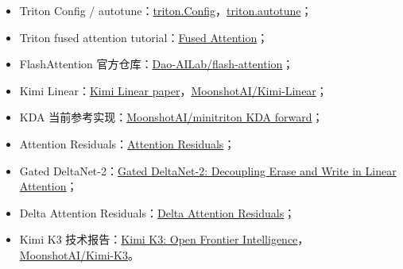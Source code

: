 \documentclass[profile=standard,twoside=false]{ipara-handbook}
\begin{document}
\begin{itemize}
  \item Triton Config / autotune：\href{https://triton-lang.org/main/python-api/generated/triton.Config.html}{triton.Config}，\href{https://triton-lang.org/main/python-api/generated/triton.autotune.html}{triton.autotune}；
  \item Triton fused attention tutorial：\href{https://triton-lang.org/main/getting-started/tutorials/06-fused-attention.html}{Fused Attention}；
  \item FlashAttention 官方仓库：\href{https://github.com/Dao-AILab/flash-attention}{Dao-AILab/flash-attention}；
  \item Kimi Linear：\href{https://arxiv.org/abs/2510.26692}{Kimi Linear paper}，\href{https://github.com/MoonshotAI/Kimi-Linear}{MoonshotAI/Kimi-Linear}；
  \item KDA 当前参考实现：\href{https://github.com/MoonshotAI/minitriton/blob/main/minitriton/ops/kda.py}{MoonshotAI/minitriton KDA forward}；
  \item Attention Residuals：\href{https://arxiv.org/abs/2603.15031}{Attention Residuals}；
  \item Gated DeltaNet-2：\href{https://arxiv.org/abs/2605.22791}{Gated DeltaNet-2: Decoupling Erase and Write in Linear Attention}；
  \item Delta Attention Residuals：\href{https://arxiv.org/abs/2605.18855}{Delta Attention Residuals}；
  \item Kimi K3 技术报告：\href{https://arxiv.org/abs/2607.24653}{Kimi K3: Open Frontier Intelligence}，\href{https://github.com/MoonshotAI/Kimi-K3}{MoonshotAI/Kimi-K3}。
\end{itemize}
\end{document}
